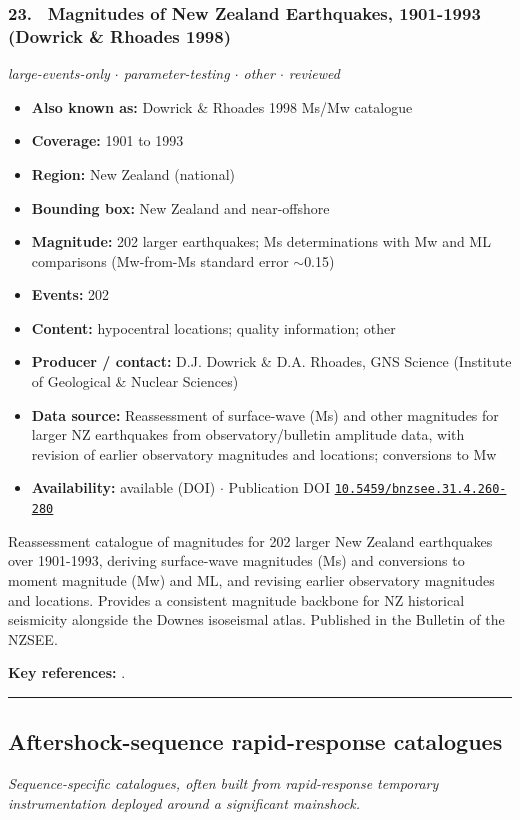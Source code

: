 \documentclass[10pt,a4paper]{article}
\newcommand{\catentryrule}{\par\vspace{3pt}\noindent\textcolor{rulegrey}{\rule{\linewidth}{0.3pt}}\par\vspace{5pt}}
\newcommand{\kv}[2]{\item \textbf{#1:} #2}
\begin{document}
\subsubsection*{\hypertarget{c:23}{23.}~ Magnitudes of New Zealand Earthquakes, 1901-1993 (Dowrick \& Rhoades 1998)}
{\small\itshape large-events-only $\cdot$ parameter-testing $\cdot$ other $\cdot$ reviewed}\par\vspace{2pt}
\begin{itemize}[leftmargin=1.3em,itemsep=0.6pt,topsep=1pt,parsep=0pt]
\kv{Also known as}{Dowrick \& Rhoades 1998 Ms/Mw catalogue}
\kv{Coverage}{1901 to 1993}
\kv{Region}{New Zealand (national)}
\kv{Bounding box}{New Zealand and near-offshore}
\kv{Magnitude}{202 larger earthquakes; Ms determinations with Mw and ML comparisons (Mw-from-Ms standard error $\sim$0.15)}
\kv{Events}{202}
\kv{Content}{hypocentral locations; quality information; other}
\kv{Producer / contact}{D.J. Dowrick \& D.A. Rhoades, GNS Science (Institute of Geological \& Nuclear Sciences)}
\kv{Data source}{Reassessment of surface-wave (Ms) and other magnitudes for larger NZ earthquakes from observatory/bulletin amplitude data, with revision of earlier observatory magnitudes and locations; conversions to Mw}
\kv{Availability}{available (DOI) $\cdot$ Publication DOI \href{https://doi.org/10.5459/bnzsee.31.4.260-280}{\nolinkurl{10.5459/bnzsee.31.4.260-280}}}
\end{itemize}
\par\vspace{2pt}Reassessment catalogue of magnitudes for 202 larger New Zealand earthquakes over 1901-1993, deriving surface-wave magnitudes (Ms) and conversions to moment magnitude (Mw) and ML, and revising earlier observatory magnitudes and locations. Provides a consistent magnitude backbone for NZ historical seismicity alongside the Downes isoseismal atlas. Published in the Bulletin of the NZSEE.
\par\vspace{2pt}\textbf{Key references:} \cite{Dowrick1998}.
\catentryrule
\subsection{Aftershock-sequence rapid-response catalogues}
\textit{Sequence-specific catalogues, often built from rapid-response temporary instrumentation deployed around a significant mainshock.}\par\vspace{4pt}
\end{document}
